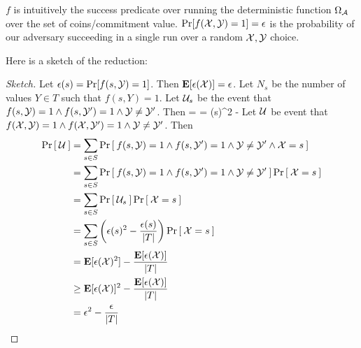 $f$ is intuitively the success predicate over running the deterministic function $\Omega_{\mathcal A}$ over the set of coins/commitment value.  $\Pr[f({\cal X},{\cal Y}) = 1] = \epsilon$ is the probability of our adversary succeeding in a single run over a random ${\cal X},{\cal Y}$ choice. 

Here is a sketch of the reduction:
\begin{proof}[Sketch]
\label{prf:lem}
Let $\epsilon(s) = \Pr[f(s,{\cal Y}) = 1]$. 
Then ${\textbf E}[\epsilon({\cal X})] = \epsilon$. Let $N_s$ be the number of values
$Y \in T$ such that $f(s,Y) = 1$. Let ${\cal U}_s$ be the event that $f(s,{\cal Y}) =
1 \land f(s,{\cal Y}') = 1 \land {\cal Y} \ne {\cal Y}'$. Then
\bnm
   =  = \epsilon(s)^2 -  
\enm
Let ${\cal U}$ be event that $f({\cal X},{\cal Y}) = 1 \land f({\cal X},{\cal Y}') = 1 \land
{\cal Y} \ne {\cal Y}'$. Then 
\begin{align*}
  \Pr\left[\: {\cal U} \:\right] 
  & = \sum_{s \in S} \Pr\left[\: f(s,{\cal Y}) = 1 \land f(s,{\cal Y}') = 1 \land {\cal Y} \ne {\cal Y}' \land {\cal X} = s \:\right]\\
  & = \sum_{s \in S} \Pr\left[\: f(s,{\cal Y}) = 1 \land f(s,{\cal Y}') = 1 \land {\cal Y} \ne {\cal Y}' \:\right]\Pr\left[\: {\cal X} = s \:\right]\\
  & = \sum_{s \in S} \Pr\left[\: {\cal U}_s \:\right] \Pr\left[\: {\cal X} = s \:\right]\\
  & = \sum_{s \in S} \left(\epsilon(s)^2 - \frac{\epsilon(s)}{|T|}\right) \Pr\left[\: {\cal X} = s \:\right]\\
  & = {\textbf E}[\epsilon({\cal X})^2] - \frac{{\textbf E}[\epsilon({\cal X})]}{|T|}\\
  & \ge {\textbf E}[\epsilon({\cal X})]^2 - \frac{{\textbf E}[\epsilon({\cal X})]}{|T|}\\
  & = \epsilon^2 - \frac{\epsilon}{|T|}
\end{align*}
\end{proof}

